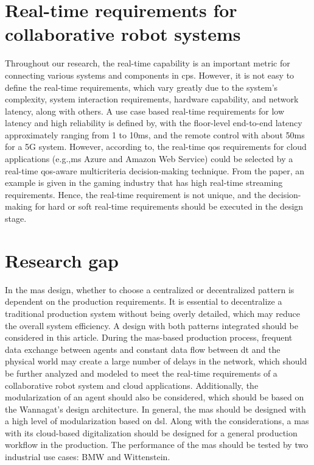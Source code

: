 \section{Real-time requirements for collaborative robot systems}
Throughout our research, the real-time capability is an important metric for connecting 
various systems and components in \gls{cps}. However, it is not easy to define the 
real-time requirements, which vary greatly due to the system's complexity, 
system interaction requirements, hardware capability, and network latency, 
along with others. 
A use case based real-time requirements for low latency and high reliability 
is defined by\cite{li_5g_2018}, with the floor-level end-to-end latency 
approximately ranging from 1 to 10ms, and the remote control with about 50ms for a 5G 
system. However, according to\cite{zhang_infrastructure_2017}, the real-time 
\gls{qos} requirements for cloud applications (e.g.,\gls{ms} Azure and Amazon Web Service) 
could be selected by a real-time \gls{qos}-aware multicriteria decision-making 
technique. From the paper, an example is given in the gaming industry that has 
high real-time streaming requirements. Hence, the real-time requirement is not unique, and the decision-making for hard or 
soft real-time requirements should be executed in the design stage. 

\section{Research gap}
In the \gls{mas} design, whether to choose a centralized or decentralized pattern 
is dependent on the production requirements. It is essential to decentralize a 
traditional production system without being overly detailed, which may reduce the 
overall system efficiency. A design with both patterns integrated should be considered 
in this article. During the \gls{mas}-based production process, frequent data exchange 
between agents and constant data flow between \gls{dt} and the physical world may create a 
large number of delays in the network, which should be further analyzed and modeled 
to meet the real-time requirements of a collaborative robot system and cloud applications\cite{zhang_infrastructure_2017}. 
Additionally, the modularization of an agent should also be considered, which should be 
based on the Wannagat's design architecture\cite{cruz_salazar_cyber-physical_2019}. 
In general, the \gls{mas} should be designed 
with a high level of modularization based on \gls{dsl}\cite{hujo_toward_2022}. Along with the considerations, 
a \gls{mas} with its cloud-based digitalization should be designed for a general production 
workflow in the production. The performance of the \gls{mas} should be tested by 
two industrial use cases: BMW and Wittenstein. 
 


